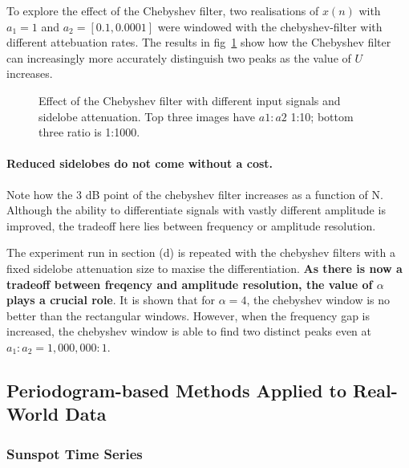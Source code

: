 \documentclass[main.tex]{subfiles}
\begin{document}
To explore the effect of the Chebyshev filter, two realisations of $x(n)$ with $a_1 =1$ and $a_2=[0.1, 0.0001]$ were windowed with the chebyshev-filter with different attebuation rates. The results in fig~\ref{fig:q1_3_f} show how the Chebyshev filter can increasingly more accurately distinguish two peaks as the value of $U$ increases.

\begin{figure}[H]
	\centering 
	\resizebox{\textwidth}{!}{}
	\caption{Effect of the Chebyshev filter with different input signals and sidelobe attenuation. Top three images have $a1:a2$ 1:10; bottom three ratio is 1:1000.}
	\label{fig:q1_3_f}
\end{figure}

\paragraph{Reduced sidelobes do not come without a cost.} Note how the 3 dB point of the chebyshev filter increases as a function of N. Although the ability to differentiate signals with vastly different amplitude is improved, the tradeoff here lies between frequency or amplitude resolution.

The experiment run in section (d) is repeated with the chebyshev filters with a fixed sidelobe attenuation size to maxise the differentiation. \textbf{As there is now a tradeoff between freqency and amplitude resolution, the value of $\alpha$ plays a crucial role}. It is shown that for $\alpha = 4$, the chebyshev window is no better than the rectangular windows. However, when the frequency gap is increased, the chebyshev window is able to find two distinct peaks even at $a_1:a_2 = 1,000,000:1$.




















\subsection{Periodogram-based Methods Applied to Real-World Data}



\subsubsection{Sunspot Time Series}
\end{document}
